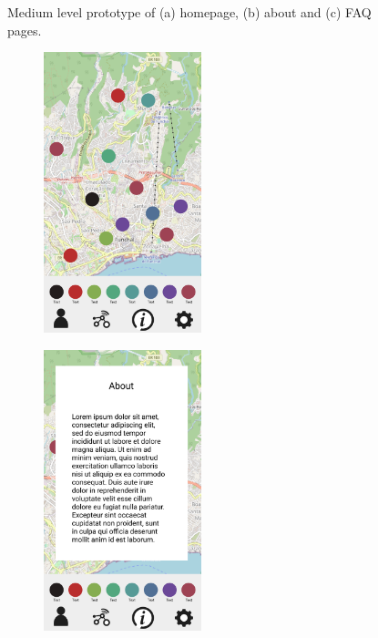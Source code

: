 \begin{figure}
\begin{subfigure}{0.33\textwidth}
        \caption{}
        \label{fig:mediumfaq}
    \end{subfigure}%
    \caption{Medium level prototype of (a) homepage, (b) about and (c) FAQ pages.}
    \label{fig:mediumlevelprototype}
\end{figure}

\begin{figure}[H]
    \centering
    \begin{subfigure}{0.33\textwidth}
        \centering
        \includegraphics[width=130pt]{../assets/images/low_homepage.png}
        \caption{}
        \label{fig:highhome}
    \end{subfigure}%
    \begin{subfigure}{0.33\textwidth}
        \centering
        \includegraphics[width=130pt]{../assets/images/low_about.png}
        \caption{}
        \label{fig:highabout}
    \end{subfigure}%
    \begin{subfigure}{0.33\textwidth}
        \centering

\end{subfigure}
\end{figure}
